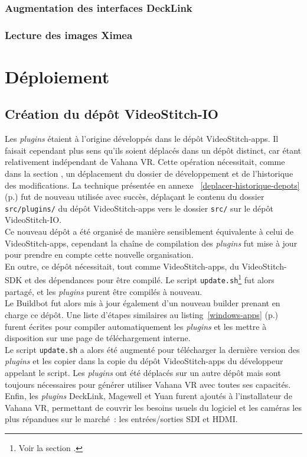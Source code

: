 \subsubsection{Augmentation des interfaces DeckLink}

\subsubsection{Lecture des images Ximea}


\section{Déploiement}
\subsection{Création du dépôt VideoStitch-IO}
Les \textit{plugins} étaient à l'origine développés dans le dépôt VideoStitch-apps. Il faisait
cependant plus sens qu'ils soient déplacés dans un dépôt distinct, car étant relativement indépendant
de Vahana VR. Cette opération nécessitait, comme dans la section , un déplacement du dossier
de développement et de l'historique des modifications. La technique présentée en annexe~
\ref{deplacer-historique-depots} (p.\pageref{deplacer-historique-depots}) fut de
nouveau utilisée avec succès, déplaçant le contenu du dossier \texttt{src/plugins/}
du dépôt VideoStitch-apps vers le dossier \texttt{src/} sur le dépôt VideoStitch-IO.\\
\newline
Ce nouveau dépôt a été organisé de manière sensiblement équivalente à celui de VideoStitch-apps, 
cependant la chaîne de compilation des \textit{plugins} fut mise à jour pour prendre en compte
cette nouvelle organisation.\\
En outre, ce dépôt nécessitait, tout comme VideoStitch-apps, du VideoStitch-SDK et des dépendances
pour être compilé. Le script \texttt{update.sh}\footnote{Voir la section .}
fut alors partagé, et les \textit{plugins} purent être compilés à nouveau.\\
\newline
Le Buildbot fut alors mis à jour également d'un nouveau builder prenant en charge ce dépôt.
Une liste d'étapes similaires au listing~\ref{windows-apps} (p.\pageref{windows-apps}) furent écrites pour
compiler automatiquement les \textit{plugins} et les mettre à disposition sur une page de 
téléchargement interne.\\
Le script \texttt{update.sh} a alors été augmenté pour télécharger
la dernière version des \textit{plugins} et les copier dans la copie du dépôt VideoStitch-apps
du développeur appelant le script. Les \textit{plugins} ont été déplacés sur un autre dépôt
mais sont toujours nécessaires pour générer utiliser Vahana VR avec toutes ses
capacités.\\
Enfin, les \textit{plugins} DeckLink, Magewell et Yuan furent ajoutés à l'installateur de Vahana VR, 
permettant de couvrir les besoins usuels du logiciel et les caméras les plus répandues
sur le marché~: les entrées/sorties SDI et HDMI.

